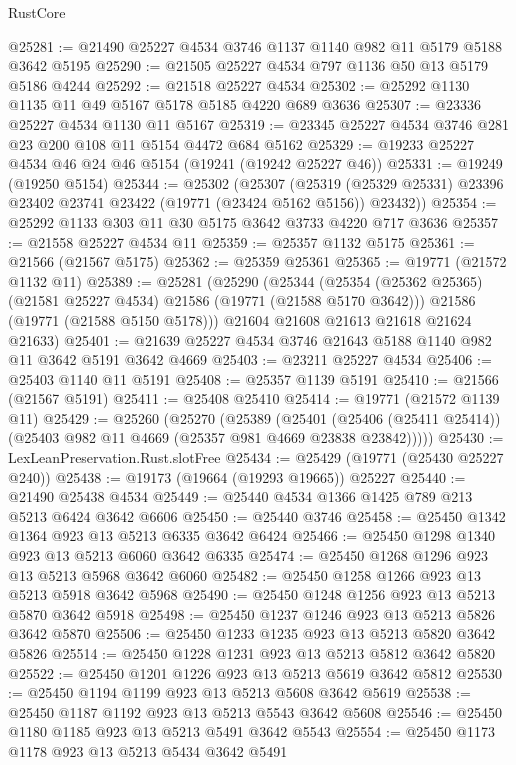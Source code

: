 \begin{lexlean}{RustCore}
\begin{coremodule}
@25281 := @21490 @25227 @4534 @3746 @1137 @1140 @982 @11 @5179 @5188 @3642 @5195
@25290 := @21505 @25227 @4534 @797 @1136 @50 @13 @5179 @5186 @4244
@25292 := @21518 @25227 @4534
@25302 := @25292 @1130 @1135 @11 @49 @5167 @5178 @5185 @4220 @689 @3636
@25307 := @23336 @25227 @4534 @1130 @11 @5167
@25319 := @23345 @25227 @4534 @3746 @281 @23 @200 @108 @11 @5154 @4472 @684 @5162
@25329 := @19233 @25227 @4534 @46 @24 @46 @5154 (@19241 (@19242 @25227 @46))
@25331 := @19249 (@19250 @5154)
@25344 := @25302
    (@25307
      (@25319 (@25329 @25331) @23396 @23402 @23741 @23422 (@19771 (@23424 @5162 @5156)) @23432))
@25354 := @25292 @1133 @303 @11 @30 @5175 @3642 @3733 @4220 @717 @3636
@25357 := @21558 @25227 @4534 @11
@25359 := @25357 @1132 @5175
@25361 := @21566 (@21567 @5175)
@25362 := @25359 @25361
@25365 := @19771 (@21572 @1132 @11)
@25389 := @25281
    (@25290
      (@25344
        (@25354 (@25362 @25365) (@21581 @25227 @4534) @21586 (@19771 (@21588 @5170 @3642)))
        @21586
        (@19771 (@21588 @5150 @5178)))
      @21604
      @21608
      @21613
      @21618
      @21624
      @21633)
@25401 := @21639 @25227 @4534 @3746 @21643 @5188 @1140 @982 @11 @3642 @5191 @3642 @4669
@25403 := @23211 @25227 @4534
@25406 := @25403 @1140 @11 @5191
@25408 := @25357 @1139 @5191
@25410 := @21566 (@21567 @5191)
@25411 := @25408 @25410
@25414 := @19771 (@21572 @1139 @11)
@25429 := @25260
    (@25270
      (@25389
        (@25401
          (@25406 (@25411 @25414))
          (@25403 @982 @11 @4669 (@25357 @981 @4669 @23838 @23842)))))
@25430 := LexLeanPreservation.Rust.slotFree
@25434 := @25429 (@19771 (@25430 @25227 @240))
@25438 := @19173 (@19664 (@19293 @19665)) @25227
@25440 := @21490 @25438 @4534
@25449 := @25440 @4534 @1366 @1425 @789 @213 @5213 @6424 @3642 @6606
@25450 := @25440 @3746
@25458 := @25450 @1342 @1364 @923 @13 @5213 @6335 @3642 @6424
@25466 := @25450 @1298 @1340 @923 @13 @5213 @6060 @3642 @6335
@25474 := @25450 @1268 @1296 @923 @13 @5213 @5968 @3642 @6060
@25482 := @25450 @1258 @1266 @923 @13 @5213 @5918 @3642 @5968
@25490 := @25450 @1248 @1256 @923 @13 @5213 @5870 @3642 @5918
@25498 := @25450 @1237 @1246 @923 @13 @5213 @5826 @3642 @5870
@25506 := @25450 @1233 @1235 @923 @13 @5213 @5820 @3642 @5826
@25514 := @25450 @1228 @1231 @923 @13 @5213 @5812 @3642 @5820
@25522 := @25450 @1201 @1226 @923 @13 @5213 @5619 @3642 @5812
@25530 := @25450 @1194 @1199 @923 @13 @5213 @5608 @3642 @5619
@25538 := @25450 @1187 @1192 @923 @13 @5213 @5543 @3642 @5608
@25546 := @25450 @1180 @1185 @923 @13 @5213 @5491 @3642 @5543
@25554 := @25450 @1173 @1178 @923 @13 @5213 @5434 @3642 @5491

\end{coremodule}
\end{lexlean}

